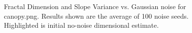 \documentclass[12pt, oneside]{book}
\begin{document}
\begin{figure}[!b]
  \centering
  \caption[Fractal Dimension and Slope Variance vs. Gaussian noise for canopy.png.]{Fractal Dimension and Slope Variance vs. Gaussian noise for canopy.png.  Results shown are the average of 100 noise seeds.  Highlighted is initial no-noise dimensional estimate.}
  \label{fig:canopy_gaussian_result}
\end{figure}
\end{document}
